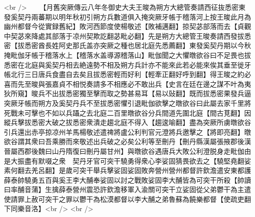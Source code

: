 <br />
　　【月舊突厥傳云八年冬御史大夫王晙為朔方大總管奏請西征抜悉密東發奚契丹兩蕃期以明年秋初引朔方兵數道俱入掩突厥牙帳于稽落河上按王晙此月為幽州都督今從實録舊紀】敗河西節度使楊敬述【敗補邁翻】掠契苾部落而去【貞觀中契苾來降處其部落于凉州契欺訖翻苾毗必翻】先是朔方大總管王晙奏請西發拔悉密【拔悉密酋長姓阿史那氏盖亦突厥之種也居北庭先悉薦翻】東發奚契丹期以今秋掩毗伽牙帳于稽落水上【稽落水盖導源稽落山】毗伽聞之大懼暾欲谷曰不足畏也拔悉密在北庭與奚契丹相去絶遠勢不相及朔方兵計亦不能來此若必能來俟其垂至徙牙帳北行三日唐兵食盡自去矣且拔悉密輕而好利【輕牽正翻好呼到翻】得王晙之約必喜而先至晙與張嘉貞不相悦奏請多不相應必不敢出兵【史言在廷在邊之謀不叶為夷狄所窺】晙兵不出拔悉密獨至擊而取之勢甚易耳【易以䜴翻】既而拔悉密果發兵逼突厥牙帳而朔方及奚契丹兵不至拔悉密懼引退毗伽欲擊之暾欲谷曰此屬去家千里將死戰未可擊也不如以兵躡之去北庭二百里暾欲谷分兵間道先圍北庭【間古莧翻】因縱兵擊拔悉密大破之拔悉密衆潰走趨北庭不得入【趨逡喻翻】盡為突厥所虜暾欲谷引兵還出赤亭掠凉州羊馬楊敬述遣禆將盧公利判官元澄將兵邀擊之【將即亮翻】暾欲谷謂其衆曰吾乘勝而來敬述出兵破之必矣公利等至刪丹【刪丹縣漢屬張掖郡後漢晉屬西郡後魏曰山丹隋復曰刪丹屬甘州】與暾欲谷遇唐兵大敗公利澄脱身走毗伽由是大振盡有默啜之衆　契丹牙官可突干驍勇得衆心李娑固猜畏欲去之【驍堅堯翻娑素何翻去羌呂翻】是歲可突干舉兵擊娑固娑固敗奔營州營州都督許欽澹遣安東都護薛泰帥驍勇五百與奚王李大酺奉娑固以討之戰敗娑固李大酺皆為可突干所殺【帥讀曰率酺音蒲】生擒薛泰營州震恐許欽澹移軍入渝關可突干立娑固從父弟鬱干為主遣使請罪上赦可突干之罪以鬱干為松漠都督以李大酺之弟魯蘇為饒樂都督【使疏吏翻下同樂音洛】<br />
<br />
